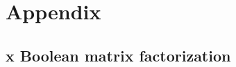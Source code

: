 \documentclass[twoside]{article}
\begin{document}
\section{Appendix} \label{sec:appendix}


\subsection{x Boolean matrix factorization}



\newpage


\end{document}
